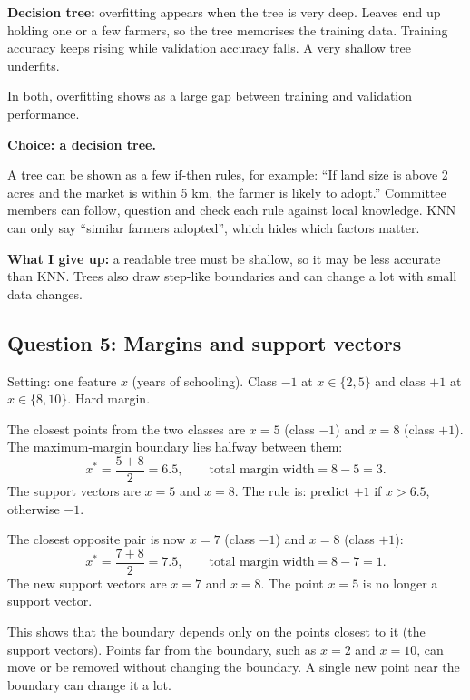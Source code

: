 \textbf{Decision tree:} overfitting appears when the tree is very deep. Leaves end up holding
one or a few farmers, so the tree memorises the training data. Training accuracy keeps rising
while validation accuracy falls. A very shallow tree underfits.

In both, overfitting shows as a large gap between training and validation performance.

\textbf{Choice: a decision tree.}

A tree can be shown as a few if-then rules, for example: ``If land size is above 2 acres and the
market is within 5 km, the farmer is likely to adopt.'' Committee members can follow, question
and check each rule against local knowledge. KNN can only say ``similar farmers adopted'',
which hides which factors matter.

\textbf{What I give up:} a readable tree must be shallow, so it may be less accurate than KNN.
Trees also draw step-like boundaries and can change a lot with small data changes.

\subsection{Question 5: Margins and support vectors}
Setting: one feature $x$ (years of schooling). Class $-1$ at $x\in\{2,5\}$ and class $+1$ at $x\in\{8,10\}$. Hard margin.

The closest points from the two classes are $x=5$ (class $-1$) and $x=8$ (class $+1$). The
maximum-margin boundary lies halfway between them:
\[
  x^{*} = \frac{5+8}{2} = 6.5, \qquad \text{total margin width} = 8 - 5 = 3.
\]
The support vectors are $x = 5$ and $x = 8$. The rule is: predict $+1$ if $x > 6.5$,
otherwise $-1$.

The closest opposite pair is now $x = 7$ (class $-1$) and $x = 8$ (class $+1$):
\[
  x^{*} = \frac{7+8}{2} = 7.5, \qquad \text{total margin width} = 8 - 7 = 1.
\]
The new support vectors are $x = 7$ and $x = 8$. The point $x = 5$ is no longer a support
vector.

This shows that the boundary depends only on the points closest to it (the support vectors).
Points far from the boundary, such as $x = 2$ and $x = 10$, can move or be removed without
changing the boundary. A single new point near the boundary can change it a lot.

